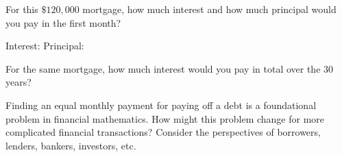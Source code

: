 \documentclass{ximera}
\begin{document}
\break

\begin{question}
For this $\$120,000$ mortgage, how much interest and how much principal
would you pay in the first month?  

Interest: 
Principal:  
\end{question}

\begin{question}
For the same mortgage, how much interest would you pay in total over the $30$ years?
\end{question}

\begin{question}
Finding an equal monthly payment for paying off a debt is a foundational problem in financial mathematics.  
How might this problem change for more complicated financial transactions?  Consider the perspectives of 
borrowers, lenders, bankers, investors, etc.  
\begin{freeResponse}
\end{freeResponse}
\end{question}
\end{document}
